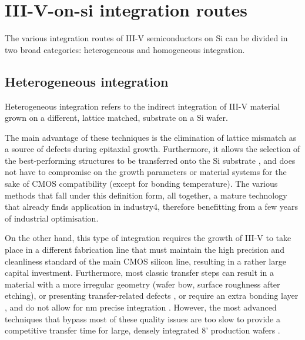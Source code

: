 \section{\texorpdfstring{III-V-on-\acs{si} integration routes}{III-V-on-Si integration routes}}
The various integration routes of III-V semiconductors on Si can be divided in two broad categories: heterogeneous and homogeneous integration.
\subsection{Heterogeneous integration}
Heterogeneous integration refers to the indirect integration of III-V material grown on a different, lattice matched, substrate on a Si wafer. 
\par
The main advantage of these techniques is the elimination of lattice mismatch as a source of defects during epitaxial growth. Furthermore, it allows the selection of the best-performing structures to be transferred onto the Si substrate \cite{Zadeh2016, Wang2017}, and does not have to compromise on the growth parameters or material systems for the sake of CMOS compatibility (except for bonding temperature). The various methods that fall under this definition form, all together, a mature technology that already finds application in industry4, therefore benefitting from a few years of industrial optimisation.
\par
On the other hand, this type of integration requires the growth of III-V to take place in a different fabrication line that must maintain the high precision and cleanliness standard of the main CMOS silicon line, resulting in a rather large capital investment. Furthermore, most classic transfer steps can result in a material with a more irregular geometry (wafer bow, surface roughness after etching), or presenting transfer-related defects \cite{Jevtics2022}, or require an extra bonding layer \cite{Jevtics2022, Tang2019}, and do not allow for nm precise integration \cite{Wang2017, McPhillimy2020}. However, the most advanced techniques that bypass most of these quality issues are too slow to provide a competitive transfer time for large, densely integrated 8' production wafers \cite{Wang2017, McPhillimy2020}.
